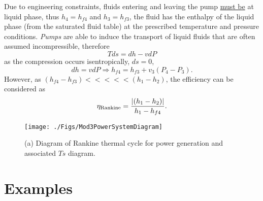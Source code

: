      Due to engineering constraints, fluids entering and leaving the pump \underline{must be} at liquid phase, thus $h_{4}=h_{f4}$ and $h_{3}=h_{f3}$, \ie the fluid has the enthalpy of the liquid phase (from the saturated fluid table) at the prescribed temperature and pressure conditions. {\it Pumps} are able to induce the transport of liquid fluids that are often assumed incompressible, therefore
          \begin{displaymath}
                Tds = dh - v dP
          \end{displaymath}
as the compression occurs isentropically, \ie $ds=0$,
          \begin{displaymath}
                dh = v dP \Rightarrow h_{f4} = h_{f3} + v_{3}\left(P_{4}-P_{3}\right).
          \end{displaymath}
However, as $\left(h_{f4}-h_{f3}\right) <<<<< \left(h_{1}-h_{2}\right)$, the efficiency can be considered as
           \begin{displaymath}
               \eta_{\text{Rankine}} = \displaystyle\frac{\left|\left(h_{1}-h_{2}\right)\right|}{h_{1}-h_{f4}}.
           \end{displaymath}     
%
   \begin{figure}[h]
      \begin{center}
         \texttt{[image: ./Figs/Mod3PowerSystemDiagram]}
      \end{center}
      \caption{ (a) Diagram of Rankine thermal cycle for power generation and associated $Ts$ diagram.}\label{Mod03Fig04}
   \end{figure}


\clearpage

\section{Examples}

